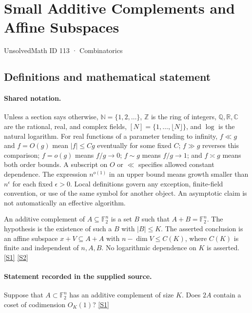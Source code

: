 \documentclass[11pt,a4paper]{article}
\newcommand{\N}{\mathbb{N}}
\newcommand{\Z}{\mathbb{Z}}
\newcommand{\Q}{\mathbb{Q}}
\newcommand{\R}{\mathbb{R}}
\newcommand{\C}{\mathbb{C}}
\newcommand{\F}{\mathbb{F}}
\newcommand{\sref}[2]{\hyperlink{source:#1:#2}{[S#2]}}
\begin{document}

\setcounter{section}{112}

\section{Small Additive Complements and Affine Subspaces}\label{113}

{\small\sffamily UnsolvedMath ID 113 · Combinatorics}

\subsection{Definitions and mathematical statement}

\paragraph{Shared notation.}Unless a section says otherwise, $\N=\{1,2,\ldots\}$,
$\Z$ is the ring of integers, $\Q,\R,\C$ are the rational, real, and complex
fields, $[N]=\{1,\ldots,\lfloor N\rfloor\}$, and $\log$ is the natural
logarithm. For real functions of a parameter tending to infinity,
$f\ll g$ and $f=O(g)$ mean $|f|\leq Cg$ eventually for some fixed $C$;
$f\gg g$ reverses this comparison; $f=o(g)$ means $f/g\to0$;
$f\sim g$ means $f/g\to1$; and $f\asymp g$ means both order bounds.
A subscript on $O$ or $\ll$ specifies allowed constant dependence.
The expression $n^{o(1)}$ in an upper bound means growth smaller than
$n^\epsilon$ for each fixed $\epsilon>0$. Local definitions govern any
exception, finite-field convention, or use of the same symbol for another
object. An asymptotic claim is not automatically an effective algorithm.



An additive complement of $A\subseteq\F_2^n$ is a set $B$ such that $A+B=\F_2^n$. The hypothesis is the existence of such a $B$ with $|B|\leq K$. The asserted conclusion is an affine subspace $x+V\subseteq A+A$ with $n-\dim V\leq C(K)$, where $C(K)$ is finite and independent of $n,A,B$. No logarithmic dependence on $K$ is asserted. \sref{113}{1} \sref{113}{2}

\paragraph{Statement recorded in the supplied source.}
Suppose that $A \subset \mathbb{F}_2^n$ has an additive complement of size $K$. Does $2A$ contain a coset of codimension $O_K(1)$? \sref{113}{1}
\end{document}
